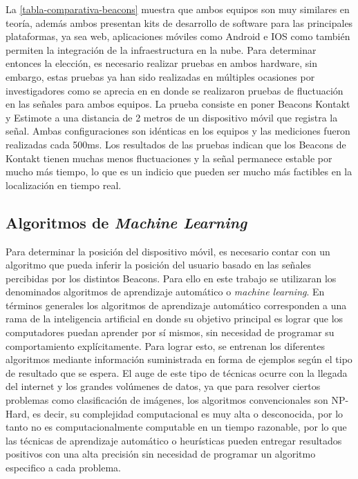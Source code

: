 La \autoref{tabla-comparativa-beacons} muestra que ambos equipos son muy similares en teoría, además ambos presentan kits de desarrollo de software para las principales plataformas, ya sea web, aplicaciones móviles como Android e IOS como también permiten la integración de la infraestructura en la nube. Para determinar entonces la elección, es necesario realizar pruebas en ambos hardware, sin embargo, estas pruebas ya han sido realizadas en múltiples ocasiones por investigadores como se aprecia en \citep{comparativaKontakt} en donde se realizaron pruebas de fluctuación en las señales para ambos equipos. La prueba consiste en poner Beacons Kontakt y Estimote a una distancia de 2 metros de un dispositivo móvil que registra la señal. Ambas configuraciones son idénticas en los equipos y las mediciones fueron realizadas cada 500ms. Los resultados de las pruebas indican que los Beacons de Kontakt tienen muchas menos fluctuaciones y la señal permanece estable por mucho más tiempo, lo que es un indicio que pueden ser mucho más factibles en la localización en tiempo real.

\subsection{Algoritmos de \textit{Machine Learning}}

Para determinar la posición del dispositivo móvil, es necesario contar con un algoritmo que pueda inferir la posición del usuario basado en las señales percibidas por los distintos Beacons. Para ello en este trabajo se utilizaran los denominados algoritmos de aprendizaje automático o \textit{machine learning}. En términos generales los algoritmos de aprendizaje automático corresponden a una rama de la inteligencia artificial en donde su objetivo principal es lograr que los computadores puedan aprender por sí mismos, sin necesidad de programar su comportamiento explícitamente. Para lograr esto, se entrenan los diferentes algoritmos mediante información suministrada en forma de ejemplos según el tipo de resultado que se espera. El auge de este tipo de técnicas ocurre con la llegada del internet y los grandes volúmenes de datos, ya que para resolver ciertos problemas como clasificación de imágenes, los algoritmos convencionales son NP-Hard, es decir, su complejidad computacional es muy alta o desconocida, por lo tanto no es computacionalmente computable en un tiempo razonable, por lo que las técnicas de aprendizaje automático o heurísticas pueden entregar resultados positivos con una alta precisión sin necesidad de programar un algoritmo especifico a cada problema.

